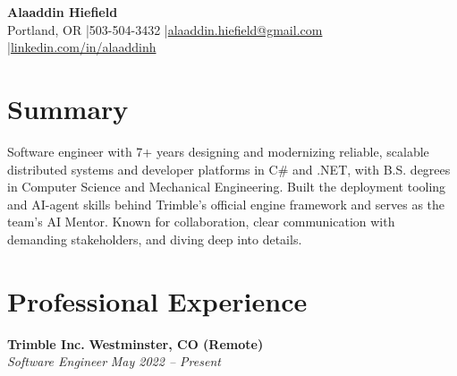 \documentclass[10pt,letterpaper]{article}
\newcommand{\sep}{\hspace{0.6em}|\hspace{0.6em}}
\newcommand{\resumeSubheading}[4]{%
  \textbf{#1} \hfill \textbf{#2} \\
  \textit{#3} \hfill \textit{#4} \par
}
\begin{document}
\begin{center}
  {\LARGE\textbf{Alaaddin Hiefield}} \\[4pt]
  Portland, OR \sep 503-504-3432 \sep \href{mailto:alaaddin.hiefield@gmail.com}{alaaddin.hiefield@gmail.com} \sep \href{https://linkedin.com/in/alaaddinh/}{linkedin.com/in/alaaddinh}
\end{center}

\section{Summary}
Software engineer with 7+ years designing and modernizing reliable, scalable distributed systems and developer platforms in C\# and .NET, with B.S. degrees in Computer Science and Mechanical Engineering. Built the deployment tooling and AI-agent skills behind Trimble's official engine framework and serves as the team's AI Mentor. Known for collaboration, clear communication with demanding stakeholders, and diving deep into details.

\section{Professional Experience}

\resumeSubheading{Trimble Inc.}{Westminster, CO (Remote)}{Software Engineer}{May 2022 -- Present}
\end{document}
